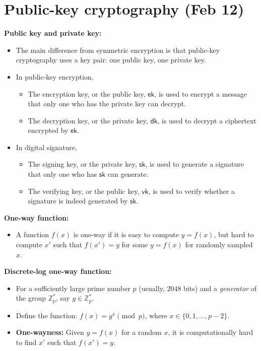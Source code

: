 \documentclass{article}
\newcommand{\msf}[1]{\mathsf{#1}}
\newcommand{\parhead}[1]{\noindent \textbf{#1}}
\begin{document}
\newpage
\section{Public-key cryptography (Feb 12)}
\parhead{Public key and private key:}
\begin{itemize}
    \item The main difference from symmetric encryption is that public-key cryptography uses a key pair: one public key, one private key. 
    
    \item In public-key encryption,
    \begin{itemize}
        \item The encryption key, or the public key, $\msf{ek}$, is used to encrypt a message that only one who has the private key can decrypt.
        
        \item The decryption key, or the private key, $\msf{dk}$, is used to decrypt a ciphertext encrypted by $\msf{ek}$.
    \end{itemize}
    
    \item In digital signature,
    \begin{itemize}
        \item The signing key, or the private key, $\msf{sk}$, is used to generate a signature that only one who has $\msf{sk}$ can generate.
        
        \item The verifying key, or the public key, $\msf{vk}$, is used to verify whether a signature is indeed generated by $\msf{sk}$.
    \end{itemize}
\end{itemize}

\parhead{One-way function:}
\begin{itemize}
    \item A function $f(x)$ is one-way if it is easy to compute $y=f(x)$, but hard to compute $x'$ such that $f(x')=y$ for some $y=f(x)$ for randomly sampled $x$.
\end{itemize}

\parhead{Discrete-log one-way function:}
\begin{itemize}
    \item For a sufficiently large prime number $p$ (usually, $2048$ bits) and a \emph{generator} of the group $\mathbb{Z}_p^*$, say $g\in\mathbb{Z}_p^*$.
    
    \item Define the function: $f(x)=g^x \pmod{p}$, where $x\in\{0,1,...,p-2\}$.
    
    \item {\bf One-wayness:} Given $y=f(x)$ for a random $x$, it is computationally hard to find $x'$ such that $f(x')=y$.
\end{itemize}
\end{document}
